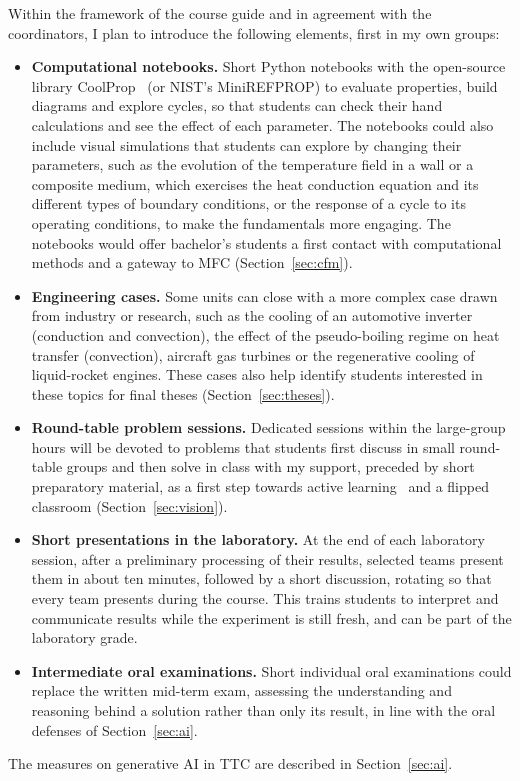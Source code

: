 \documentclass[11pt]{article}
\begin{document}
Within the framework of the course guide and in agreement with the coordinators, I plan to introduce the following elements, first in my own groups:
\begin{itemize}
  \item \textbf{Computational notebooks.} 
  Short Python notebooks with the open-source library CoolProp~\cite{CoolProp2014} (or NIST's MiniREFPROP) to evaluate properties, build diagrams and explore cycles, so that students can check their hand calculations and see the effect of each parameter. 
  The notebooks could also include visual simulations that students can explore by changing their parameters, such as the evolution of the temperature field in a wall or a composite medium, which exercises the heat conduction equation and its different types of boundary conditions, or the response of a cycle to its operating conditions, to make the fundamentals more engaging. 
  The notebooks would offer bachelor's students a first contact with computational methods and a gateway to MFC (Section~\ref{sec:cfm}).
  \item \textbf{Engineering cases.} Some units can close with a more complex case drawn from industry or research, such as the cooling of an automotive inverter (conduction and convection), the effect of the pseudo-boiling regime on heat transfer (convection), aircraft gas turbines or the regenerative cooling of liquid-rocket engines. These cases also help identify students interested in these topics for final theses (Section~\ref{sec:theses}).
  \item \textbf{Round-table problem sessions.}
  Dedicated sessions within the large-group hours will be devoted to problems that students first discuss in small round-table groups and then solve in class with my support, preceded by short preparatory material, as a first step towards active learning~\cite{Freeman2014} and a flipped classroom (Section~\ref{sec:vision}).
  \item \textbf{Short presentations in the laboratory.}
  At the end of each laboratory session, after a preliminary processing of their results, selected teams present them in about ten minutes, followed by a short discussion, rotating so that every team presents during the course. 
  This trains students to interpret and communicate results while the experiment is still fresh, and can be part of the laboratory grade.
  \item \textbf{Intermediate oral examinations.}
  Short individual oral examinations could replace the written mid-term exam, assessing the understanding and reasoning behind a solution rather than only its result, in line with the oral defenses of Section~\ref{sec:ai}. 
\end{itemize}
The measures on generative AI in TTC are described in Section~\ref{sec:ai}.
\end{document}

